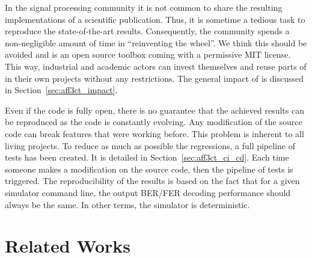 In the signal processing community it is not common to share the resulting
implementations of a scientific publication. Thus, it is sometime a tedious task
to reproduce the state-of-the-art results. Consequently, the community spends a
non-negligible amount of time in ``reinventing the wheel''. We think this should
be avoided and \AFFECT is an open source toolbox coming with a permissive MIT
license. This way, industrial and academic actors can invest themselves and
reuse parts of \AFFECT in their own projects without any restrictions. The
general impact of \AFFECT is discussed in Section~\ref{sec:aff3ct_impact}.

Even if the code is fully open, there is no guarantee that the achieved results
can be reproduced as the code is constantly evolving. Any modification of the
source code can break features that were working before. This problem is
inherent to all living projects. To reduce as much as possible the regressions,
a full pipeline of tests has been created. It is detailed in
Section~\ref{sec:aff3ct_ci_cd}. Each time someone makes a modification on the
\AFFECT source code, then the pipeline of tests is triggered. The
reproducibility of the results is based on the fact that for a given \AFFECT
simulator command line, the output BER/FER decoding performance should always be
the same. In other terms, the \AFFECT simulator is deterministic.

\section{Related Works}
\label{sec:aff3ct_related_works}

